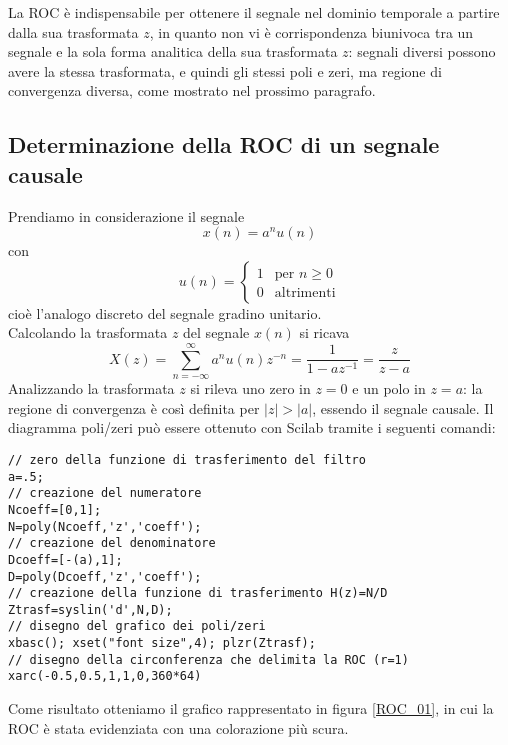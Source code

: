 La ROC \`e indispensabile per ottenere il segnale nel dominio temporale a partire dalla sua trasformata $z$, in quanto non vi \`e corrispondenza biunivoca tra un segnale e la sola forma analitica della sua trasformata $z$: segnali diversi possono avere la stessa trasformata, e quindi gli stessi poli e zeri, ma regione di convergenza diversa, come mostrato nel prossimo paragrafo.

\subsection{Determinazione della ROC di un segnale causale}
Prendiamo in considerazione il segnale
\begin{displaymath}
x(n)=a^n u(n)
\end{displaymath}
con
\begin{displaymath}
u(n)= \left\{
\begin{array}{ll}
1 & \textrm{per } n\geq0\\
0 & \textrm{altrimenti}
\end{array}
\right.
\end{displaymath}
cio\`e l'analogo discreto del segnale gradino unitario.\\
Calcolando la trasformata $z$ del segnale ${x(n)}$ si ricava
\begin{displaymath}
X(z) = \sum_{n=-\infty}^\infty a^{n}u(n)z^{-n}=\frac{1}{1-az^{-1}}=\frac{z}{z-a}
\end{displaymath}
Analizzando la trasformata $z$ si rileva uno zero in $z=0$ e un polo in $z=a$: la regione di convergenza \`e cos\`i definita per $|z|>|a|$, essendo il segnale causale.
Il diagramma poli/zeri pu\`o essere ottenuto con Scilab tramite i seguenti comandi:
\begin{verbatim}
// zero della funzione di trasferimento del filtro
a=.5;
// creazione del numeratore
Ncoeff=[0,1];
N=poly(Ncoeff,'z','coeff');
// creazione del denominatore
Dcoeff=[-(a),1];
D=poly(Dcoeff,'z','coeff');
// creazione della funzione di trasferimento H(z)=N/D
Ztrasf=syslin('d',N,D);
// disegno del grafico dei poli/zeri
xbasc(); xset("font size",4); plzr(Ztrasf);
// disegno della circonferenza che delimita la ROC (r=1)
xarc(-0.5,0.5,1,1,0,360*64)
\end{verbatim}
Come risultato otteniamo il grafico rappresentato in figura \ref{ROC_01}, in cui la ROC \`e stata evidenziata con una colorazione pi\`u scura.\\\\


